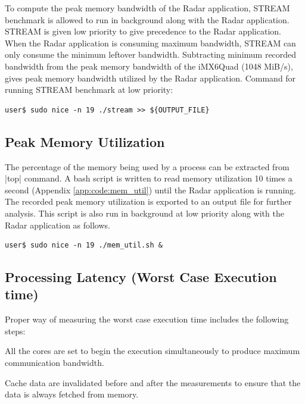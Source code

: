 To compute the peak memory bandwidth of the Radar application, STREAM benchmark is allowed to run in background along with the Radar application. STREAM is given low priority to give precedence to the Radar application. When the Radar application is consuming maximum bandwidth, STREAM can only consume the minimum leftover bandwidth. Subtracting minimum recorded bandwidth from the peak memory bandwidth of the iMX6Quad (1048 MiB/s), gives peak memory bandwidth utilized by the Radar application. Command for running STREAM benchmark at low priority: \\
\begin{lstlisting}
user$ sudo nice -n 19 ./stream >> ${OUTPUT_FILE}
\end{lstlisting}

\subsection{Peak Memory Utilization}
\label{ss:mm:mem_util}
The percentage of the memory being used by a process can be extracted from \bverb|top| command. A bash script is written to read memory utilization 10 times a second (Appendix \ref{app:code:mem_util}) until the Radar application is running. The recorded peak memory utilization is exported to an output file for further analysis. This script is also run in background at low priority along with the Radar application as follows.\\
\begin{lstlisting}
user$ sudo nice -n 19 ./mem_util.sh &
\end{lstlisting}

\subsection{Processing Latency (Worst Case Execution time)}
\label{ss:mm:latency}
Proper way of measuring the worst case execution time includes the following steps:
\begin{compactitem} 
	\item All the cores are set to begin the execution simultaneously to produce maximum communication bandwidth.
	\item Cache data are invalidated before and after the measurements to ensure that the data is always fetched from memory.
\end{compactitem} 

